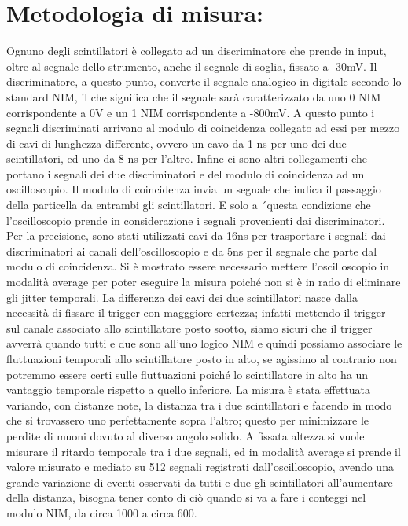 \documentclass{article}
\begin{document}
\section{Metodologia di misura:}
Ognuno degli scintillatori è collegato ad un discriminatore che prende in input, oltre al segnale dello strumento, anche il segnale di soglia, fissato a -30mV. Il discriminatore, a questo punto, converte il segnale analogico in digitale secondo lo standard NIM, il che significa che il segnale sarà caratterizzato da uno 0 NIM corrispondente a 0V e un 1 NIM corrispondente a -800mV. A questo punto i segnali discriminati arrivano al modulo di coincidenza collegato ad
essi per mezzo di cavi di lunghezza differente, ovvero un cavo da 1 ns per uno dei due scintillatori, ed uno da 8 ns per l'altro. Infine ci sono altri collegamenti che portano i segnali dei due discriminatori
e del modulo di coincidenza ad un oscilloscopio. Il modulo di coincidenza invia un segnale che indica il passaggio della particella da entrambi gli scintillatori. E solo a ´questa condizione che l’oscilloscopio prende in considerazione i segnali provenienti dai
discriminatori. Per la precisione, sono stati utilizzati cavi da 16ns per trasportare i segnali dai discriminatori ai canali dell’oscilloscopio e da 5ns per il segnale che parte dal modulo di
coincidenza. Si è mostrato essere necessario mettere l'oscilloscopio in modalità average per poter eseguire la misura poiché non si è in rado di eliminare gli  jitter temporali. La differenza dei cavi dei due scintillatori nasce dalla necessità di fissare il trigger con magggiore certezza; infatti mettendo il trigger sul canale associato allo scintillatore posto sootto, siamo sicuri che il trigger avverrà quando tutti e due sono all'uno logico NIM e quindi possiamo associare le fluttuazioni temporali allo scintillatore posto in alto, se agissimo al contrario non potremmo essere certi sulle fluttuazioni poiché lo scintillatore in alto ha un vantaggio temporale rispetto a quello inferiore. La misura è stata effettuata variando, con distanze note, la distanza tra i due scintillatori e facendo in modo che si trovassero uno perfettamente sopra l'altro; questo per minimizzare le perdite di muoni dovuto al diverso angolo solido. A fissata altezza si vuole misurare il ritardo temporale tra i due segnali, ed in modalità average si prende il valore misurato e mediato su 512 segnali registrati dall'oscilloscopio, avendo una grande variazione di eventi osservati da tutti e due gli scintillatori all'aumentare della distanza, bisogna tener conto di ciò quando si va a fare i conteggi nel modulo NIM, da circa 1000 a circa 600.
~
\end{document}
